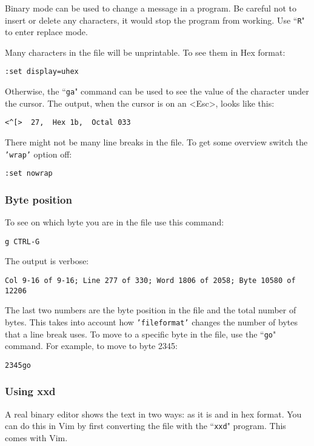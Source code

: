 Binary mode can be used to change a message in a program.
Be careful not to insert or delete any characters, it would stop the program from working.
Use ``\texttt{R}" to enter replace mode.

Many characters in the file will be unprintable.
To see them in Hex format:

\begin{Verbatim}[samepage=true]
 :set display=uhex
\end{Verbatim}

Otherwise, the ``\texttt{ga}" command can be used to see the value of the character under the cursor.
The output, when the cursor is on an <Esc>, looks like this:

\begin{Verbatim}[samepage=true]
    <^[>  27,  Hex 1b,  Octal 033 
\end{Verbatim}

There might not be many line breaks in the file.
To get some overview switch the \texttt{'wrap'} option off:

\begin{Verbatim}[samepage=true]
 :set nowrap
\end{Verbatim}

\subsubsection{Byte position}
To see on which byte you are in the file use this command:

\begin{Verbatim}[samepage=true]
 g CTRL-G
\end{Verbatim}

The output is verbose:

\begin{Verbatim}[samepage=true]
    Col 9-16 of 9-16; Line 277 of 330; Word 1806 of 2058; Byte 10580 of 12206 
\end{Verbatim}

The last two numbers are the byte position in the file and the total number of bytes.
This takes into account how \texttt{'fileformat'} changes the number of bytes that a line break uses.
To move to a specific byte in the file, use the ``\texttt{go}" command.
For example, to move to byte 2345:

\begin{Verbatim}[samepage=true]
 2345go
\end{Verbatim}

\subsubsection{Using xxd}
A real binary editor shows the text in two ways: as it is and in hex format.
You can do this in Vim by first converting the file with the ``\texttt{xxd}" program.
This comes with Vim.

